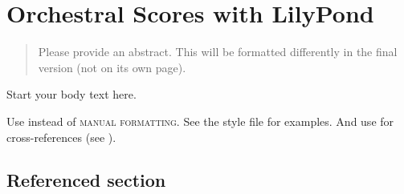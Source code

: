 \documentclass{scrreprt}
\begin{document}
\chapter{Orchestral Scores with LilyPond}
\begin{abstract}
Please provide an abstract.
This will be formatted differently in the final version (not on its own page).
\end{abstract}

Start your body text here.

Use  instead of \textsc{manual formatting}.
See the style file  for examples.
And use  for cross-references (see ).


\pagebreak

\section{Referenced section}
\label{sec:ref_sec}
\end{document}
